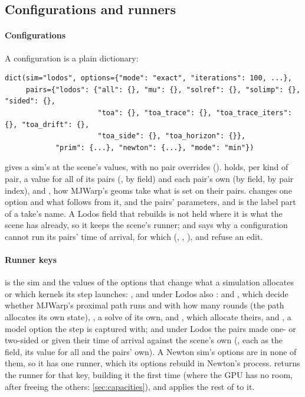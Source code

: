 \subsection{Configurations and runners}\label{sec:runners}

\paragraph{Configurations} A configuration is a plain dictionary:

\begin{lstlisting}
dict(sim="lodos", options={"mode": "exact", "iterations": 100, ...},
     pairs={"lodos": {"all": {}, "mu": {}, "solref": {}, "solimp": {}, "sided": {},
                      "toa": {}, "toa_trace": {}, "toa_trace_iters": {}, "toa_drift": {},
                      "toa_side": {}, "toa_horizon": {}},
            "prim": {...}, "newton": {...}, "mode": "min"})
\end{lstlisting}

 gives a sim's at the scene's values, with no pair overrides ().  holds, per kind of pair, a value for all of its pairs (, by field) and each pair's own (by field, by pair index), and , how MJWarp's geoms take what is set on their pairs.  changes one option and what follows from it,  and  the pairs' parameters, and  is the label part of a take's name. A Lodos field that rebuilds is not held where it is what the scene has already, so it keeps the scene's runner; and  says why a configuration cannot run its pairs' time of arrival, for which  (, , ),  and  refuse an edit.

\paragraph{Runner keys}  is the sim and the values of the options that change what a simulation allocates or which kernels its step launches: , and under Lodos also :  and , which decide whether MJWarp's proximal path runs and with how many rounds (the path allocates its own state), , a solve of its own,  and , which allocate theirs, and , a model option the step is captured with; and under Lodos the pairs made one- or two-sided or given their time of arrival against the scene's own (, each as the field, its value for all and the pairs' own). A Newton sim's options are in none of them, so it has one runner, which its options rebuild in Newton's process.  returns the runner for that key, building it the first time (where the GPU has no room, after freeing the others: \cref{sec:capacities}), and applies the rest of  to it.

